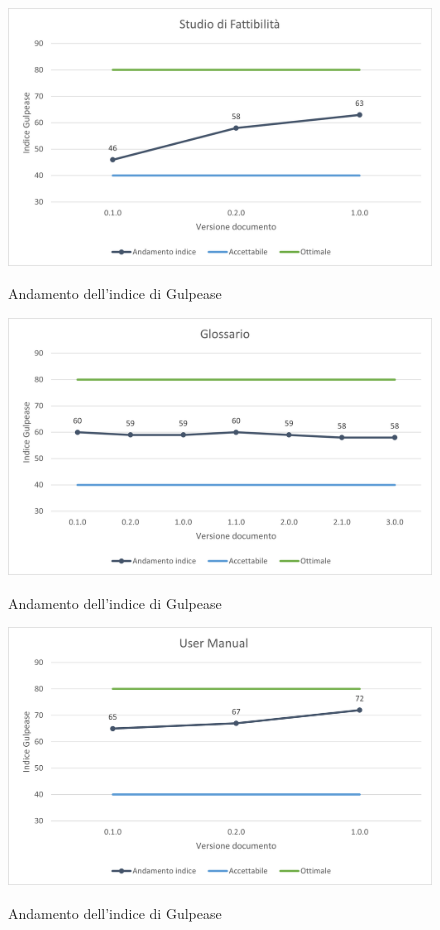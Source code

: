 \begin{figure}[H]
\centering
\includegraphics[scale=0.78]{res/ResocontoAttivitaDiVerifica/res/metriche/grafici/img/gulpeaseSDF.png}\\
\caption{Andamento dell'indice di Gulpease \SdF}
\end{figure}

\begin{figure}[H]
\centering
\includegraphics[scale=0.78]{res/ResocontoAttivitaDiVerifica/res/metriche/grafici/img/gulpeaseG.png}\\
\caption{Andamento dell'indice di Gulpease \Glossario}
\end{figure}

\begin{figure}[H]
\centering
\includegraphics[scale=0.78]{res/ResocontoAttivitaDiVerifica/res/metriche/grafici/img/gulpeaseUM.png}\\
\caption{Andamento dell'indice di Gulpease \MU}
\end{figure}

